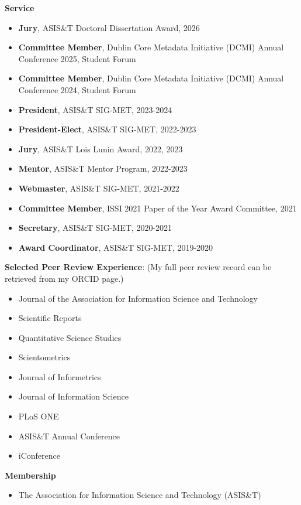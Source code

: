 \documentclass[margin, 10pt]{res} %
\begin{document}
\begin{resume}
\textbf{Service}
\begin{itemize}
\item \textbf{Jury}, ASIS\&T Doctoral Dissertation Award, 2026
\item \textbf{Committee Member}, Dublin Core Metadata Initiative (DCMI) Annual Conference 2025, Student Forum
\item \textbf{Committee Member}, Dublin Core Metadata Initiative (DCMI) Annual Conference 2024, Student Forum
\item \textbf{President}, ASIS\&T SIG-MET, 2023-2024
\item \textbf{President-Elect}, ASIS\&T SIG-MET, 2022-2023
\item \textbf{Jury}, ASIS\&T Lois Lunin Award, 2022, 2023
\item \textbf{Mentor}, ASIS\&T Mentor Program, 2022-2023
\item \textbf{Webmaster}, ASIS\&T SIG-MET, 2021-2022
\item \textbf{Committee Member}, ISSI 2021 Paper of the Year Award Committee, 2021
\item \textbf{Secretary}, ASIS\&T SIG-MET, 2020-2021
\item \textbf{Award Coordinator}, ASIS\&T SIG-MET, 2019-2020
\end{itemize}

\textbf{Selected Peer Review Experience}:  
(My full peer review record can be retrieved from my ORCID page.)

\begin{itemize}
\item Journal of the Association for Information Science and Technology
\item Scientific Reports
\item Quantitative Science Studies
\item Scientometrics
\item Journal of Informetrics
\item Journal of Information Science
\item PLoS ONE
\item ASIS\&T Annual Conference
\item iConference 
\end{itemize}

\textbf{Membership}
\begin{itemize}
\item The Association for Information Science and Technology (ASIS\&T)
\end{itemize}


\end{resume}
\end{document}
